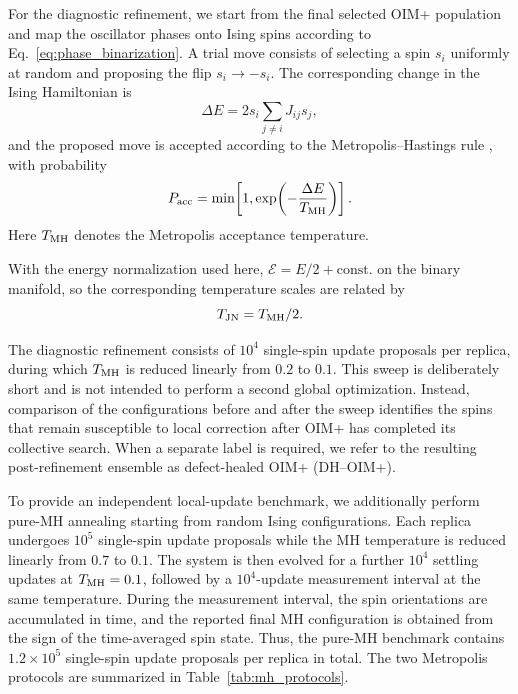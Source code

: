 \documentclass[
reprint,
amsmath,amssymb,
aps,
pre,
floatfix,
]{revtex4-2}
\begin{document}
For the diagnostic refinement, we start from the final selected OIM+
population and map the oscillator phases onto Ising spins according to
Eq.~\eqref{eq:phase_binarization}. A trial move consists of selecting a
spin $s_i$ uniformly at random and proposing the flip
$s_i\rightarrow -s_i$. The corresponding change in the Ising Hamiltonian is
\begin{equation}
\Delta E
=
2s_i\sum_{j\neq i}J_{ij}s_j ,
\label{eq:mh_deltaE}
\end{equation}
and the proposed move is accepted according to the Metropolis--Hastings
rule \cite{MH}, with probability
\begin{equation}
P_{\rm acc}
=
\min\!\left[
1,
\exp\!\left(-\frac{\Delta E}{T_{\rm MH}}\right)
\right].
\label{eq:mh_accept}
\end{equation}
Here $T_{\rm MH}$ denotes the Metropolis acceptance temperature.



With the energy normalization used here, $\mathcal{E}=E/2+\mathrm{const.}$ on the binary manifold, so the corresponding temperature scales are related by
\begin{equation}
T_{\rm JN}= T_{\rm MH}/2.
\end{equation}

The diagnostic refinement consists of $10^4$ single-spin update proposals
per replica, during which $T_{\rm MH}$ is reduced linearly from $0.2$ to
$0.1$. This sweep is deliberately short and is not intended to perform a
second global optimization. Instead, comparison of the configurations
before and after the sweep identifies the spins that remain susceptible to
local correction after OIM+ has completed its collective search. When a
separate label is required, we refer to the resulting post-refinement
ensemble as  defect-healed OIM+ (DH--OIM+).



To provide an independent local-update benchmark, we additionally perform
pure-MH annealing starting from random Ising configurations. Each replica
undergoes $10^5$ single-spin update proposals while the MH temperature is
reduced linearly from $0.7$ to $0.1$. The system is then evolved for a
further $10^4$ settling updates at $T_{\rm MH}=0.1$, followed by a
$10^4$-update measurement interval at the same temperature. During the
measurement interval, the spin orientations are accumulated in time, and
the reported final MH configuration is obtained from the sign of the
time-averaged spin state. Thus, the pure-MH benchmark contains
$1.2\times10^5$ single-spin update proposals per replica in total.
The two Metropolis protocols are summarized in
Table~\ref{tab:mh_protocols}.
\end{document}
